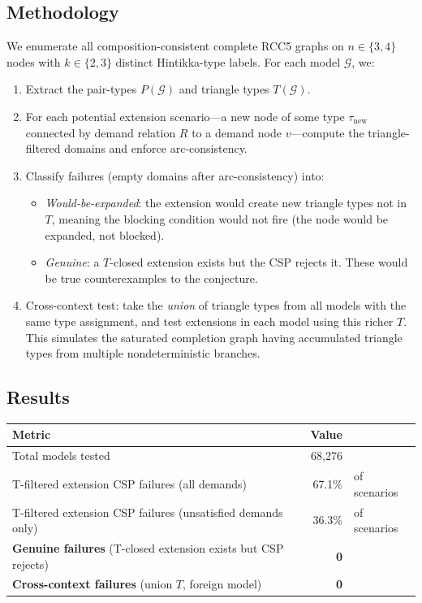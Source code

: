 \documentclass[a4paper,11pt]{article}
\theoremstyle{definition}
\begin{document}
\subsection{Methodology}

We enumerate all composition-consistent complete RCC5 graphs on
$n \in \{3, 4\}$ nodes with $k \in \{2, 3\}$ distinct Hintikka-type
labels.  For each model $\mathcal{G}$, we:
\begin{enumerate}[nosep]
  \item Extract the pair-types $P(\mathcal{G})$ and triangle types
    $T(\mathcal{G})$.
  \item For each potential extension scenario---a new node of some
    type $\tau_{\mathrm{new}}$ connected by demand relation $R$ to a
    demand node $v$---compute the triangle-filtered domains and
    enforce arc-consistency.
  \item Classify failures (empty domains after arc-consistency) into:
    \begin{itemize}[nosep]
      \item \emph{Would-be-expanded}: the extension would create new
        triangle types not in $T$, meaning the blocking condition
        would not fire (the node would be expanded, not blocked).
      \item \emph{Genuine}: a $T$-closed extension exists but the CSP
        rejects it.  These would be true counterexamples to the
        conjecture.
    \end{itemize}
  \item Cross-context test: take the \emph{union} of triangle types
    from all models with the same type assignment, and test extensions
    in each model using this richer $T$.  This simulates the saturated
    completion graph having accumulated triangle types from multiple
    nondeterministic branches.
\end{enumerate}

\subsection{Results}

\begin{center}
\renewcommand{\arraystretch}{1.2}
\begin{tabular}{lrl}
\toprule
\textbf{Metric} & \textbf{Value} & \\
\midrule
Total models tested & 68,276 & \\
T-filtered extension CSP failures (all demands) & 67.1\% & of scenarios \\
T-filtered extension CSP failures (unsatisfied demands only) & 36.3\% & of scenarios \\
\midrule
\textbf{Genuine failures} (T-closed extension exists but CSP rejects)
  & \textbf{0} & \\
\textbf{Cross-context failures} (union $T$, foreign model)
  & \textbf{0} & \\
\bottomrule
\end{tabular}
\end{center}
\end{document}
